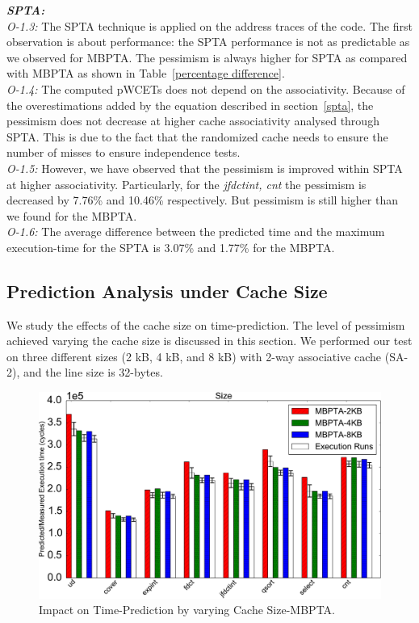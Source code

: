 \textit{\textbf{SPTA:}}\\
\textit{O-1.3:} The SPTA technique is applied on the address traces of the code. The first observation is about performance: the SPTA performance is not as predictable as  we observed for  MBPTA. The pessimism is always higher for  SPTA as compared with  MBPTA as shown in Table~\ref{percentage difference}.\\
\textit{O-1.4:} The computed pWCETs does not depend on the associativity. Because of the overestimations added by the equation described in section~\ref{spta}, the pessimism does not decrease at higher cache associativity analysed through SPTA. This is due to the fact that the randomized cache needs to ensure the number of misses to ensure independence tests.\\
\textit{O-1.5:} However, we have observed that the pessimism is improved within  SPTA at higher associativity. Particularly, for the \textit{jfdctint, cnt} the pessimism is decreased by 7.76\% and 10.46\% respectively. But pessimism is still higher than we found for the MBPTA.\\
\textit{O-1.6:} The average difference between the predicted time and the maximum execution-time for the SPTA is 3.07\% and 1.77\% for the MBPTA.



\subsection{Prediction Analysis under Cache Size}
We study the effects of the cache size on time-prediction. The level of pessimism achieved varying the cache size is discussed in this section. We performed our test on three different sizes (2 kB, 4 kB, and 8 kB) with 2-way associative cache (SA-2), and the line size is 32-bytes. 

\begin{figure}[tb!]
\centering
\includegraphics[scale=0.4]{figures/cachesize-mbpta.pdf}
\caption{Impact on Time-Prediction by varying Cache Size-MBPTA.}
\label{Cachesize-MBPTA}
\end{figure}

